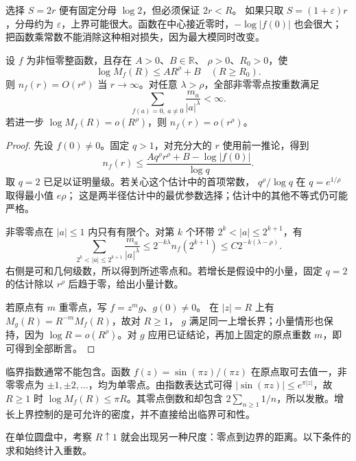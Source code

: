 选择 \(S=2r\) 便有固定分母 \(\log2\)，但必须保证 \(2r<R\)。
如果只取 \(S=(1+\varepsilon)r\)，分母约为 \(\varepsilon\)，上界可能很大。函数在中心接近零时，\(-\log|f(0)|\) 也会很大；把函数乘常数不能消除这种相对损失，因为最大模同时改变。

\begin{proposition}[增长界限制零点密度]\label{b3:prop:18-growth-zero-density}
设 \(f\) 为非恒零整函数，且存在 \(A>0\)、\(B\in\mathbb R\)、
\(\rho>0\)、\(R_0>0\)，使
\[
 \log M_f(R)\le AR^\rho+B\quad(R\ge R_0).
\]
则 \(n_f(r)=O(r^\rho)\) 当 \(r\to\infty\)。对任意 \(\lambda>\rho\)，全部非零零点按重数满足
\[
 \sum_{f(a)=0,\ a\ne0}\frac{m_a}{|a|^\lambda}<\infty.
\]
若进一步 \(\log M_f(R)=o(R^\rho)\)，则
\(n_f(r)=o(r^\rho)\)。
\end{proposition}
\begin{proof}
先设 \(f(0)\ne0\)。固定 \(q>1\)，对充分大的 \(r\) 使用前一推论，得到
\[
 n_f(r)\le\frac{Aq^\rho r^\rho+B-\log|f(0)|}{\log q}.
\]
取 \(q=2\) 已足以证明量级。若关心这个估计中的首项常数，
\(q^\rho/\log q\) 在 \(q=e^{1/\rho}\) 取得最小值 \(e\rho\)；
这是两半径估计中的最优参数选择；估计中的其他不等式仍可能严格。

非零零点在 \(|a|\le1\) 内只有有限个。对第 \(k\) 个环带
\(2^k<|a|\le2^{k+1}\)，有
\[
 \sum_{2^k<|a|\le2^{k+1}}\frac{m_a}{|a|^\lambda}
 \le2^{-k\lambda}n_f(2^{k+1})
 \le C2^{-k(\lambda-\rho)}.
\]
右侧是可和几何级数，所以得到所述零点和。若增长是假设中的小量，固定 \(q=2\) 的估计除以 \(r^\rho\) 后趋于零，给出小量计数。

若原点有 \(m\) 重零点，写 \(f=z^m g\)、\(g(0)\ne0\)。
在 \(|z|=R\) 上有 \(M_g(R)=R^{-m}M_f(R)\)，故对 \(R\ge1\)，
\(g\) 满足同一上增长界；小量情形也保持，因为
\(\log R=o(R^\rho)\)。对 \(g\) 应用已证结论，再加上固定的原点重数 \(m\)，即可得到全部断言。
\end{proof}

临界指数通常不能包含。函数
\(f(z)=\sin(\pi z)/(\pi z)\) 在原点取可去值一，非零零点为
\(\pm1,\pm2,\ldots\)，均为单零点。由指数表达式可得
\(|\sin(\pi z)|\le e^{\pi|z|}\)，故 \(R\ge1\) 时
\(\log M_f(R)\le\pi R\)。其零点倒数和却包含
\(2\sum_{n\ge1}1/n\)，所以发散。增长上界控制的是可允许的密度，并不直接给出临界可和性。

\ProseParagraphBreak
在单位圆盘中，考察 \(R\uparrow1\) 就会出现另一种尺度：零点到边界的距离。以下条件的求和始终计入重数。

